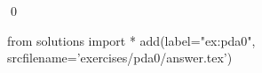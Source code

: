
\begin{ex} 
  \label{ex:pda0}
  
  \qed
\end{ex} 
\begin{python0}
from solutions import *
add(label="ex:pda0",
    srcfilename='exercises/pda0/answer.tex') 
\end{python0}
